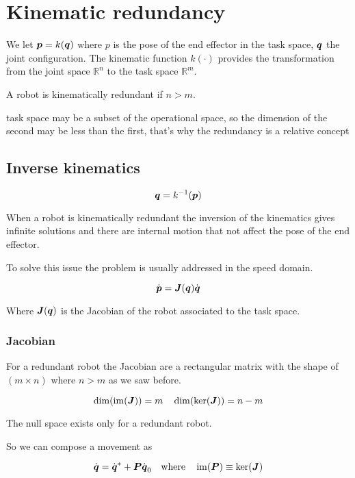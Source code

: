 \chapter{Kinematic redundancy}\label{ch:kinematic-redundancy}

We let $\boldsymbol{p}=k(\boldsymbol{q})$ where $p$ is the pose of the end effector in the task space, $\boldsymbol{q}$ the joint configuration. The kinematic function $k(\cdot)$ provides the transformation from the joint space $\mathbb{R}^n$ to the task space $\mathbb{R}^m$.

A robot is kinematically redundant if $n > m$.

\begin{nb}task space may be a subset of the operational space, so the dimension of the second may be less than the first, that's why the redundancy is a relative concept\end{nb}

\section{Inverse kinematics}

\[ \boldsymbol{q}=k^{-1}(\boldsymbol{p}) \]

When a robot is kinematically redundant the inversion of the kinematics gives infinite solutions and there are internal motion that not affect the pose of the end effector.

To solve this issue the problem is usually addressed in the speed domain.

\begin{equation}
	\dot{\boldsymbol{p}} = \boldsymbol{J}(\boldsymbol{q}) \dot{\boldsymbol{q}}
	\label{eq:inverse-constraint}
\end{equation}

Where $\boldsymbol{J}(\boldsymbol{q})$ is the Jacobian of the robot associated to the task space.

\subsection{Jacobian}

For a redundant robot the Jacobian are a rectangular matrix with the shape of $(m \times n)$ where $n > m$ as we saw before.

\[ \dim(\operatorname{im}(\boldsymbol{J})) = m \quad \dim(\ker(\boldsymbol{J})) = n - m \]

The null space exists only for a redundant robot.

So we can compose a movement as

\[ \dot{\boldsymbol{q}} = \dot{\boldsymbol{q}}^* + \boldsymbol{P} \dot{\boldsymbol{q}}_0 \quad \text{where} \quad \operatorname{im}(\boldsymbol{P}) \equiv \ker(\boldsymbol{J}) \]

